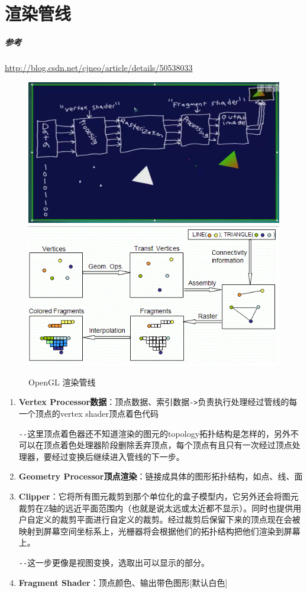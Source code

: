 \documentclass[UTF8,a4paper,8pt]{ctexbook}
\begin{document}
	\section{渲染管线}
		\subparagraph{参考}\url{http://blog.csdn.net/cjneo/article/details/50538033}
		\begin{figure}[h]
			\centering
			\includegraphics[scale = 0.4]{OpenGLPipeline.png}
			\includegraphics[scale = 0.8]{OpenGLPipeline1.png}
			\caption{OpenGL 渲染管线}
		\end{figure}
	
		\begin{enumerate}
			\item \textbf{Vertex Processor数据}：顶点数据、索引数据\verb|->|负责执行处理经过管线的每一个顶点的vertex shader顶点着色代码
			
				\verb|--|这里顶点着色器还不知道渲染的图元的topology拓扑结构是怎样的，另外不可以在顶点着色处理器阶段删除丢弃顶点，每个顶点有且只有一次经过顶点处理器，要经过变换后继续进入管线的下一步。
				
			\item \textbf{Geometry Processor顶点渲染}：链接成具体的图形拓扑结构，如点、线、面
			
			\item \textbf{Clipper}：它将所有图元裁剪到那个单位化的盒子模型内，它另外还会将图元裁剪在Z轴的远近平面范围内（也就是说太远或太近都不显示）。同时也提供用户自定义的裁剪平面进行自定义的裁剪。经过裁剪后保留下来的顶点现在会被映射到屏幕空间坐标系上，光栅器将会根据他们的拓扑结构把他们渲染到屏幕上。
			
				\verb|--|这一步更像是视图变换，选取出可以显示的部分。
				
			\item \textbf{Fragment Shader}：顶点颜色、输出带色图形[默认白色]
		\end{enumerate}
	
\end{document}
